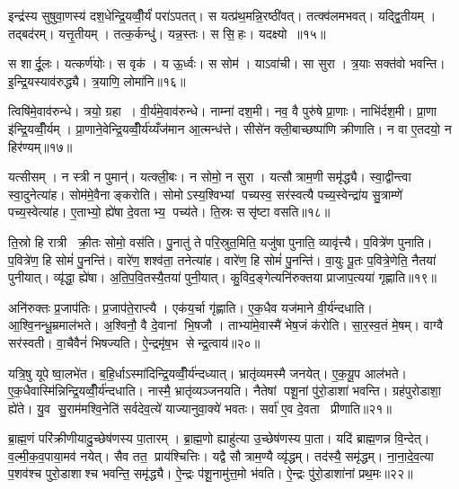 इन्द्र॑स्य सुषुवा॒णस्य॑ दश॒धेन्द्रि॒यव्वीँ॒र्यं॑ परा॑ऽपतत्। स यत्प्र॑थ॒मन्नि॒रष्ठी॑वत्। तत्क्व॑लमभवत्। यद्द्वि॒तीयम्। तद्बद॑रम्। यत्तृ॒तीयम्। तत्क॒र्कन्धु॑। यन्न॒स्तः। स सि॒हः। यदक्ष्यो॥१५॥

स शार्दू॒लः। यत्कर्ण॑योः। स वृक॑। य ऊ॒र्ध्वः। स सोम॑। याऽवा॑ची। सा सुरा। त्र॒याः सक्त॑वो भवन्ति। इ॒न्द्रि॒यस्याव॑रुद्ध्यै। त्र॒याणि॒ लोमा॑नि॥१६॥

त्विषि॑मे॒वाव॑रुन्धे। त्रयो॒ ग्रहा। वी॒र्य॑मे॒वाव॑रुन्धे। नाम्ना॑ दश॒मी। नव॒ वै पुरु॑षे प्रा॒णाः। नाभि॑र्दश॒मी। प्रा॒णा इ॑न्द्रि॒यव्वीँ॒र्यम्। प्रा॒णाने॒वेन्द्रि॒यव्वीँ॒र्य॑य्यँज॑मान आ॒त्मन्ध॑त्ते। सीसे॑न क्ली॒बाच्छष्पा॑णि क्रीणाति। न वा ए॒तदयो॒ न हिर॑ण्यम्॥१७॥

यत्सीसम्। न स्त्री न पुमान्॑। यत्क्ली॒बः। न सोमो॒ न सुरा। यत्सौत्राम॒णी समृ॑द्ध्यै। स्वा॒द्वीन्त्वा स्वा॒दुनेत्या॑ह। सोम॑मे॒वैनाङ्करोति। सोमोऽस्य॒श्विभ्यां पच्यस्व॒ सर॑स्वत्यै पच्य॒स्वेन्द्रा॑य सु॒त्राम्णे॑ पच्य॒स्वेत्या॑ह। ए॒ताभ्यो॒ ह्ये॑षा दे॒वताभ्य॒ पच्य॑ते। ति॒स्रः ससृ॑ष्टा वसति॥१८॥

ति॒स्रो हि रात्री क्री॒तः सोमो॒ वस॑ति। पु॒नातु॑ ते परि॒स्रुत॒मिति॒ यजु॑षा पुनाति॒ व्यावृ॑त्त्यै। प॒वित्रे॑ण पुनाति। प॒वित्रे॑ण॒ हि सोमं॑ पु॒नन्ति॑। वारे॑ण॒ शश्व॑ता॒ तनेत्या॑ह। वारे॑ण॒ हि सोमं॑ पु॒नन्ति॑। वा॒युः पू॒तः प॒वित्रे॒णेति॒ नैतया॑ पुनीयात्। व्यृ॑द्धा॒ ह्ये॑षा। अ॒ति॒प॒वि॒तस्यै॒तया॑ पुनी॒यात्। कु॒विद॒ङ्गेत्यनि॑रुक्तया प्राजाप॒त्यया॑ गृह्णाति॥१९॥

अनि॑रुक्तः प्र॒जाप॑तिः। प्र॒जाप॑ते॒राप्त्यै। एक॑य॒र्चा गृ॑ह्णाति। ए॒क॒धैव यज॑माने वी॒र्य॑न्दधाति। आ॒श्वि॒नन्धू॒म्रमाल॑भते। अ॒श्विनौ॒ वै दे॒वानां भि॒षजौ। ताभ्या॑मे॒वास्मै॑ भेष॒जं क॑रोति। सा॒र॒स्व॒तं मे॒षम्। वाग्वै सर॑स्वती। वा॒चैवैनं॑ भिषज्यति। ऐ॒न्द्रमृ॑ष॒भ सेन्द्र॒त्वाय॑॥२०॥\anuvakamend[अक्ष्यो॒र्लोमा॑नि॒ हिर॑ण्यं वसति गृह्णाति भिषज्य॒त्येकं च]

यत्रि॒षु यूपेष्वा॒लभे॑त। ब॒हि॒र्धाऽस्मा॑दिन्द्रि॒यव्वीँ॒र्य॑न्दध्यात्। भ्रातृ॑व्यमस्मै जनयेत्। ए॒क॒यू॒प आल॑भते। ए॒क॒धैवास्मि॑न्निन्द्रि॒यव्वीँ॒र्य॑न्दधाति। नास्मै॒ भ्रातृ॑व्यञ्जनयति। नैतेषां पशू॒नां पु॑रो॒डाशा॑ भवन्ति। ग्रह॑पुरोडाशा॒ ह्ये॑ते। यु॒व सु॒राम॑मश्वि॒नेति॑ सर्वदेव॒त्ये॑ याज्यानुवा॒क्ये॑ भवतः। सर्वा॑ ए॒व दे॒वता प्रीणाति॥२१॥

ब्रा॒ह्म॒णं परि॑क्रीणीयादु॒च्छेष॑णस्य पा॒तारम्। ब्रा॒ह्म॒णो ह्याहु॑त्या उ॒च्छेष॑णस्य पा॒ता। यदि॑ ब्राह्म॒णन्न वि॒न्देत्। व॒ल्मी॒क॒व॒पाया॒मव॑ नयेत्। सैव तत॒ प्राय॑श्चित्तिः। यद्वै सौत्राम॒ण्यै व्यृ॑द्धम्। तद॑स्यै॒ समृ॑द्धम्। ना॒ना॒दे॒व॒त्या प॒शव॑श्च पुरो॒डाशाश्च भवन्ति॒ समृ॑द्ध्यै। ऐ॒न्द्रः प॑शू॒नामु॑त्त॒मो भ॑वति। ऐ॒न्द्रः पु॑रो॒डाशा॑नां प्रथ॒मः॥२२॥

